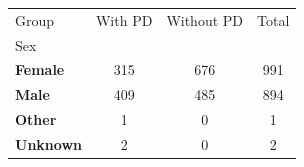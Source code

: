 \begin{table}
\label{tab:sex_dist}
\begin{tabular}{lccc}
\toprule
Group & With PD & Without PD & Total \\
Sex &  &  &  \\
\midrule
\textbf{Female} & 315 & 676 & 991 \\
\textbf{Male} & 409 & 485 & 894 \\
\textbf{Other} & 1 & 0 & 1 \\
\textbf{Unknown} & 2 & 0 & 2 \\
\bottomrule
\end{tabular}
\end{table}
